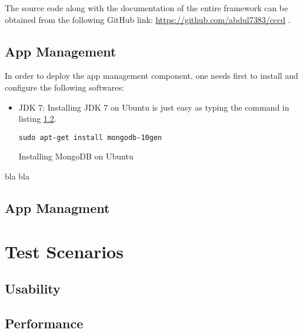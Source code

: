 The source code along with the documentation of the entire framework can be obtained from the following GitHub link: \url{https://github.com/abdul7383/cccd} .

\subsection{App Management\label{sec:eval_te_en_app}}
In order to deploy the app management component, one needs first to install and configure the following softwares:

\begin{itemize}
\item{\ac{JDK} 7:} Installing  \ac{JDK} 7 on Ubuntu is just easy as typing the command in listing \ref{}.
\begin{code}
\begin{verbatim}
sudo apt-get install mongodb-10gen
\end{verbatim}
\caption{Installing MongoDB on Ubuntu}
\label{lst:mongdb_installation}
\end{code}
\end{itemize}
bla bla

\subsection{App Managment\label{sec:eval_te_en_mongo}}
\section{Test Scenarios\label{sec:eval__te_sc}}
	\subsection{Usability\label{seq:eval_usab}}
	
	\subsection{Performance\label{seq:eval_perf}}